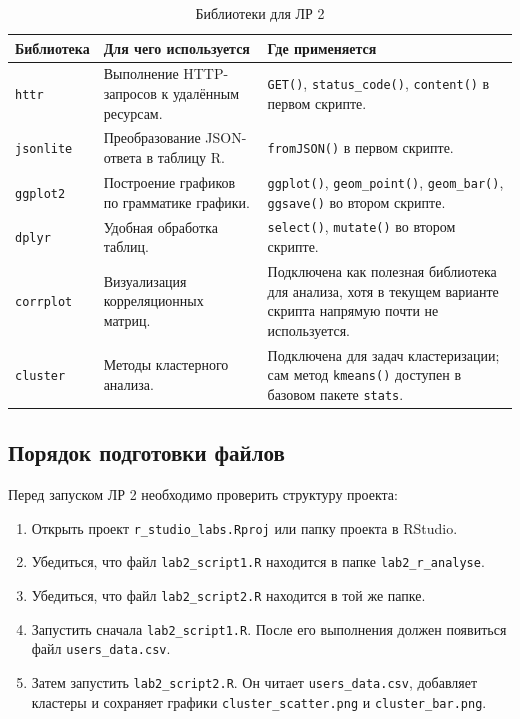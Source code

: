 \documentclass[14pt,a4paper]{extarticle}
\begin{document}
\begin{table}[H]
\caption{Библиотеки для ЛР 2}
\begin{tabularx}{\textwidth}{|l|Y|Y|}
\hline
\textbf{Библиотека} & \textbf{Для чего используется} & \textbf{Где применяется} \\
\hline
\texttt{httr} & Выполнение HTTP-запросов к удалённым ресурсам. & \texttt{GET()}, \texttt{status\_code()}, \texttt{content()} в первом скрипте. \\
\hline
\texttt{jsonlite} & Преобразование JSON-ответа в таблицу R. & \texttt{fromJSON()} в первом скрипте. \\
\hline
\texttt{ggplot2} & Построение графиков по грамматике графики. & \texttt{ggplot()}, \texttt{geom\_point()}, \texttt{geom\_bar()}, \texttt{ggsave()} во втором скрипте. \\
\hline
\texttt{dplyr} & Удобная обработка таблиц. & \texttt{select()}, \texttt{mutate()} во втором скрипте. \\
\hline
\texttt{corrplot} & Визуализация корреляционных матриц. & Подключена как полезная библиотека для анализа, хотя в текущем варианте скрипта напрямую почти не используется. \\
\hline
\texttt{cluster} & Методы кластерного анализа. & Подключена для задач кластеризации; сам метод \texttt{kmeans()} доступен в базовом пакете \texttt{stats}. \\
\hline
\end{tabularx}
\end{table}

\subsection{Порядок подготовки файлов}

Перед запуском ЛР 2 необходимо проверить структуру проекта:

\begin{enumerate}[nosep]
  \item Открыть проект \texttt{r\_studio\_labs.Rproj} или папку проекта в RStudio.
  \item Убедиться, что файл \texttt{lab2\_script1.R} находится в папке \texttt{lab2\_r\_analyse}.
  \item Убедиться, что файл \texttt{lab2\_script2.R} находится в той же папке.
  \item Запустить сначала \texttt{lab2\_script1.R}. После его выполнения должен появиться файл \texttt{users\_data.csv}.
  \item Затем запустить \texttt{lab2\_script2.R}. Он читает \texttt{users\_data.csv}, добавляет кластеры и сохраняет графики \texttt{cluster\_scatter.png} и \texttt{cluster\_bar.png}.
\end{enumerate}
\end{document}
